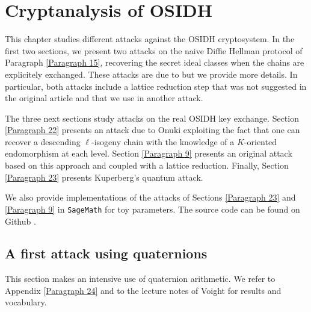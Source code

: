\documentclass[a4paper,10pt,notitlepage]{report}
\theoremstyle{definition}
\theoremstyle{plain}
\theoremstyle{definition}
\renewcommand{\(}{\left(}
\renewcommand{\)}{\right)}
\begin{document}
\chapter{Cryptanalysis of OSIDH}

This chapter studies different attacks against the OSIDH cryptosystem. In the first two sections, we present two attacks on the naive Diffie Hellman protocol of Paragraph \ref{Paragraph 15}, recovering the secret ideal classes when the chains are explicitely exchanged. These attacks are due to \cite[§ 5.1]{OSIDH} but we provide more details.  In particular, both attacks include a lattice reduction step that was not suggested in the original article and that we use in another attack. 

The three next sections study attacks on the real OSIDH key exchange. Section \ref{Paragraph 22} presents an attack due to Onuki \cite[§ 6.3]{Onuki} exploiting the fact that one can recover a descending $\ell$-isogeny chain with the knowledge of a $K$-oriented endomorphism at each level. Section \ref{Paragraph 9} presents an original attack based on this approach and coupled with a lattice reduction. Finally, Section \ref{Paragraph 23} presents Kuperberg's quantum attack.

We also provide implementations of the attacks of Sections \ref{Paragraph 23} and \ref{Paragraph 9} in \verb?SageMath? \cite{sagemath} for toy parameters. The source code can be found on Github \cite{MyGithub}.

\section{A first attack using quaternions}\label{Paragraph 7}

This section makes an intensive use of quaternion arithmetic. We refer to Appendix \ref{Paragraph 24} and to the lecture notes of Voight \cite{Voight} for results and vocabulary. 
\end{document}
